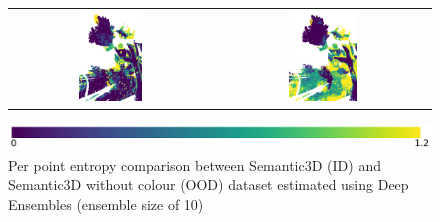 \begin{figure}[h!]
\begin{tabular}{cc}
            \includegraphics[width=0.33\textwidth, height=0.18\textheight]{images/ood_imgs/de_sem3d/de_ent_10_3.pdf}&
            \includegraphics[width=0.33\textwidth, height=0.18\textheight]{images/sem3d_of/de_ent_sem3d_of_3.pdf}\\
        \end{tabular}
        \includegraphics[scale=0.45]{images/ent_legend.pdf}
        \caption{Per point entropy comparison between Semantic3D (ID) and Semantic3D without colour (OOD) dataset estimated using Deep Ensembles (ensemble size of 10)}
        \label{fig:de_entmap_vis_sem3d_OF}
    \end{figure}
